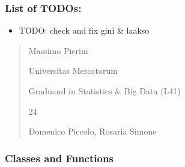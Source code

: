 \documentclass[letterpaper,10pt,english]{sphinxmanual}
\begin{document}
\subsubsection{List of TODOs:}
\label{\detokenize{cubmods:id155}}\begin{itemize}
\item {} 
\sphinxAtStartPar
TODO: check and fix gini \& laakso

\end{itemize}
\begin{quote}\begin{description}
\sphinxAtStartPar
Massimo Pierini

\sphinxAtStartPar
Universitas Mercatorum

\sphinxAtStartPar
Graduand in Statistics \& Big Data (L41)

\sphinxhyphen{}24

\sphinxAtStartPar
Domenico Piccolo, Rosaria Simone

\sphinxAtStartPar
{}

\end{description}\end{quote}


\subsubsection{Classes and Functions}
\label{\detokenize{cubmods:id156}}
\end{document}
